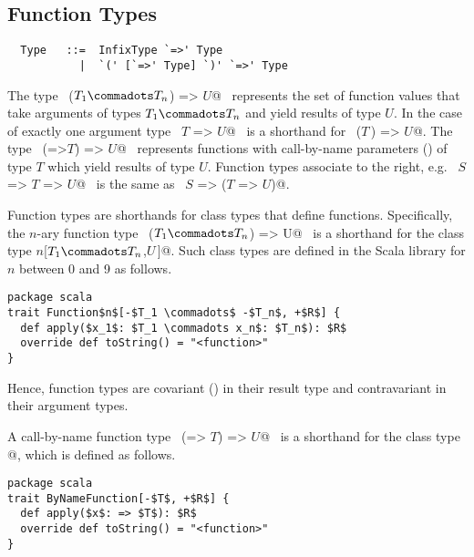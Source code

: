 
\subsection{Function Types}
\label{sec:function-types}

\syntax\begin{lstlisting}
  Type   ::=  InfixType `=>' Type
           |  `(' [`=>' Type] `)' `=>' Type
\end{lstlisting}
The type ~\lstinline@($T_1 \commadots T_n$) => $U$@~ represents the set of function
values that take arguments of types $T_1 \commadots T_n$ and yield
results of type $U$.  In the case of exactly one argument type
~\lstinline@$T$ => $U$@~ is a shorthand for ~\lstinline@($T\,$) => $U$@.  
The type ~\lstinline@(=>$T$) => $U$@~ represents functions with
call-by-name parameters () of type $T$ which yield
results of type $U$.
Function types associate to the right, e.g.
~\lstinline@$S$ => $T$ => $U$@~ is the same as 
~\lstinline@$S$ => ($T$ => $U$)@.

Function types are shorthands for class types that define 
functions.  Specifically, the $n$-ary function type 
~\lstinline@($T_1 \commadots T_n$) => U@~ is a shorthand for the class type
\lstinline@Function$n$[$T_1 \commadots T_n$,$U\,$]@. Such class
types are defined in the Scala library for $n$ between 0 and 9 as follows.
\begin{lstlisting}
package scala 
trait Function$n$[-$T_1 \commadots$ -$T_n$, +$R$] {
  def apply($x_1$: $T_1 \commadots x_n$: $T_n$): $R$ 
  override def toString() = "<function>" 
}
\end{lstlisting}
Hence, function types are covariant () in their
result type and contravariant in their argument types.

A call-by-name function type ~\lstinline@(=> $T$) => $U$@~ is a
shorthand for the class type
\lstinline@ByNameFunction[$T$,$U\,$]@, which is defined as follows.
\begin{lstlisting}
package scala 
trait ByNameFunction[-$T$, +$R$] {
  def apply($x$: => $T$): $R$ 
  override def toString() = "<function>" 
}
\end{lstlisting}

